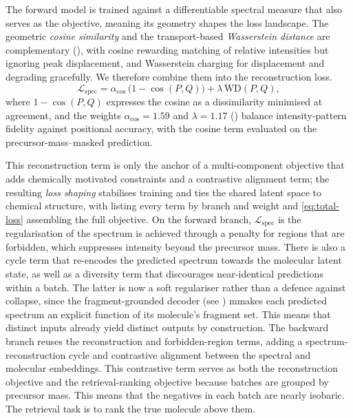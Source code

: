 The forward model is trained against a differentiable spectral measure that also serves as the objective, meaning its geometry shapes the loss landscape.
The geometric \emph{cosine similarity} and the transport-based \emph{Wasserstein distance} are complementary (), with cosine rewarding matching of relative intensities but ignoring peak displacement, and Wasserstein charging for displacement and degrading gracefully. We therefore combine them into the reconstruction loss.
\begin{equation}
    \label{eq:combined-loss}
    \mathcal{L}_{\mathrm{spec}} = \alpha_{\cos}\,\bigl(1 - \cos(P,Q)\bigr) + \lambda\,\mathrm{WD}(P,Q),
\end{equation}
where $1-\cos(P,Q)$ expresses the cosine as a dissimilarity minimised at agreement, and the weights $\alpha_{\cos}=1.59$ and $\lambda=1.17$ () balance intensity-pattern fidelity against positional accuracy, with the cosine term evaluated on the precursor-mass--masked prediction.

This reconstruction term is only the anchor of a multi-component objective that adds chemically motivated constraints and a contrastive alignment term; the resulting \emph{loss shaping} stabilises training and ties the shared latent space to chemical structure, with  listing every term by branch and weight and \cref{eq:total-loss} assembling the full objective.
On the forward branch, $\mathcal{L}_{\mathrm{spec}}$ is the regularisation of the spectrum is achieved through a penalty for regions that are forbidden, which suppresses intensity beyond the precursor mass.
There is also a cycle term that re-encodes the predicted spectrum towards the molecular latent state, as well as a diversity term that discourages near-identical predictions within a batch.
The latter is now a soft regulariser rather than a defence against collapse, since the fragment-grounded decoder (see ) mmakes each predicted spectrum an explicit function of its molecule's fragment set.
This means that distinct inputs already yield distinct outputs by construction.
The backward branch reuses the reconstruction and forbidden-region terms, adding a spectrum-reconstruction cycle and contrastive alignment between the spectral and molecular embeddings.
This contrastive term serves as both the reconstruction objective and the retrieval-ranking objective because batches are grouped by precursor mass.
This means that the negatives in each batch are nearly isobaric.
The retrieval task is to rank the true molecule above them.

